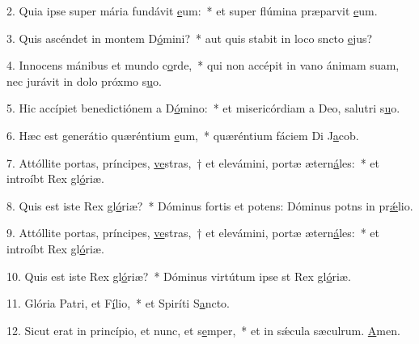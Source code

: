 2. Quia ipse super mária fundávit \uline{e}um:~* et super flúmina præparvit \uline{e}um.\par 
3. Quis ascéndet in montem D\uline{ó}mini?~* aut quis stabit in loco sncto \uline{e}jus?\par 
4. Innocens mánibus et mundo c\uline{o}rde,~* qui non accépit in vano ánimam suam, nec jurávit in dolo próxmo s\uline{u}o.\par 
5. Hic accípiet benedictiónem a D\uline{ó}mino:~* et misericórdiam a Deo, salutri s\uline{u}o.\par 
6. Hæc est generátio quæréntium \uline{e}um,~* quæréntium fáciem Di J\uline{a}cob.\par 
7. Attóllite portas, príncipes, \uline{ve}stras,~† et elevámini, portæ ætern\uline{á}les:~* et introíbt Rex gl\uline{ó}riæ.\par 
8. Quis est iste Rex gl\uline{ó}riæ?~* Dóminus fortis et potens: Dóminus potns in pr\uline{ǽ}lio.\par 
9. Attóllite portas, príncipes, \uline{ve}stras,~† et elevámini, portæ ætern\uline{á}les:~* et introíbt Rex gl\uline{ó}riæ.\par 
10. Quis est iste Rex gl\uline{ó}riæ?~* Dóminus virtútum ipse st Rex gl\uline{ó}riæ.\par 
11. Glória Patri, et F\uline{í}lio,~* et Spiríti S\uline{a}ncto.\par 
12. Sicut erat in princípio, et nunc, et s\uline{e}mper,~* et in sǽcula sæculrum. \uline{A}men.\par 

